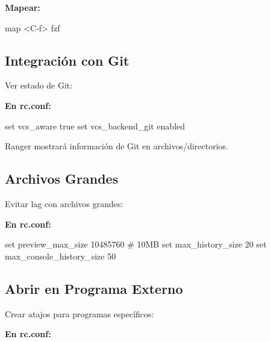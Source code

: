 \documentclass[
  doc,
  floatsintext,
  longtable,
  a4paper,
  nolmodern,
  notxfonts,
  notimes,
  12pt,
  colorlinks=true,linkcolor=blue,citecolor=blue,urlcolor=blue]{apa7}
\newenvironment{Shaded}{\begin{snugshade}}{\end{snugshade}}
\newcommand{\BuiltInTok}[1]{\textcolor[rgb]{0.00,0.23,0.31}{#1}}
\newcommand{\CommentTok}[1]{\textcolor[rgb]{0.37,0.37,0.37}{#1}}
\newcommand{\ExtensionTok}[1]{\textcolor[rgb]{0.00,0.23,0.31}{#1}}
\newcommand{\NormalTok}[1]{\textcolor[rgb]{0.00,0.23,0.31}{#1}}
\newcommand{\OperatorTok}[1]{\textcolor[rgb]{0.37,0.37,0.37}{#1}}
\begin{document}
\textbf{Mapear:}

\begin{Shaded}
\begin{Highlighting}[]
\ExtensionTok{map} \OperatorTok{\textless{}}\NormalTok{C{-}f}\OperatorTok{\textgreater{}}\NormalTok{ fzf}
\end{Highlighting}
\end{Shaded}

\subsection{Integración con Git}\label{integraciuxf3n-con-git}

Ver estado de Git:

\textbf{En rc.conf:}

\begin{Shaded}
\begin{Highlighting}[]
\BuiltInTok{set}\NormalTok{ vcs\_aware true}
\BuiltInTok{set}\NormalTok{ vcs\_backend\_git enabled}
\end{Highlighting}
\end{Shaded}

Ranger mostrará información de Git en archivos/directorios.

\subsection{Archivos Grandes}\label{archivos-grandes}

Evitar lag con archivos grandes:

\textbf{En rc.conf:}

\begin{Shaded}
\begin{Highlighting}[]
\BuiltInTok{set}\NormalTok{ preview\_max\_size 10485760  }\CommentTok{\# 10MB}
\BuiltInTok{set}\NormalTok{ max\_history\_size 20}
\BuiltInTok{set}\NormalTok{ max\_console\_history\_size 50}
\end{Highlighting}
\end{Shaded}

\subsection{Abrir en Programa Externo}\label{abrir-en-programa-externo}

Crear atajos para programas específicos:

\textbf{En rc.conf:}
\end{document}
